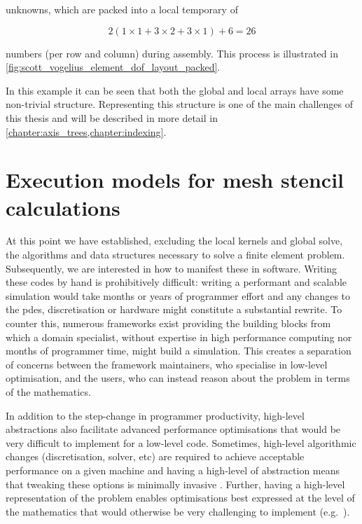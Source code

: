 \documentclass[thesis]{subfiles}
\begin{document}
unknowns, which are packed into a local temporary of

\begin{equation*}
  2 ( 1 \times 1 + 3 \times 2 + 3 \times 1 ) + 6 = 26
\end{equation*}

numbers (per row and column) during assembly.
This process is illustrated in \cref{fig:scott_vogelius_element_dof_layout_packed}.

In this example it can be seen that both the global and local arrays have some non-trivial structure.
Representing this structure is one of the main challenges of this thesis and will be described in more detail in \cref{chapter:axis_trees,chapter:indexing}.

\section{Execution models for mesh stencil calculations}


At this point we have established, excluding the local kernels and global solve, the algorithms and data structures necessary to solve a finite element problem.
Subsequently, we are interested in how to manifest these in software.
Writing these codes by hand is prohibitively difficult: writing a performant and scalable simulation would take months or years of programmer effort and any changes to the \glspl{pde}, discretisation or hardware might constitute a substantial rewrite.
To counter this, numerous frameworks exist providing the building blocks from which a domain specialist, without expertise in high performance computing nor months of programmer time, might build a simulation.
This creates a separation of concerns between the framework maintainers, who specialise in low-level optimisation, and the users, who can instead reason about the problem in terms of the mathematics.

In addition to the step-change in programmer productivity, high-level abstractions also facilitate advanced performance optimisations that would be very difficult to implement for a low-level code.
Sometimes, high-level algorithmic changes (discretisation, solver, etc) are required to achieve acceptable performance on a given machine and having a high-level of abstraction means that tweaking these options is minimally invasive \parencite{betteridgeCodeGenerationProductive2021}.
Further, having a high-level representation of the problem enables optimisations best expressed at the level of the mathematics that would otherwise be very challenging to implement (e.g.~\cite{homolyaExposingExploitingStructure2017}).
\end{document}
